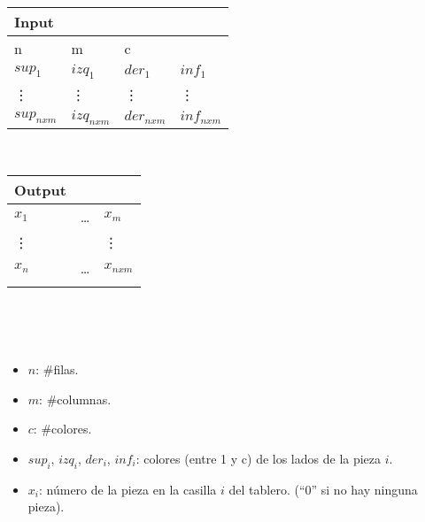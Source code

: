 \documentclass[11pt, a4paper, twoside]{article}
\begin{document}
\begin{center}
\begin{minipage}{0.5\textwidth}
	\begin{tabular}{llll}
		Input  \\
		\hline
		n       & m       & c       &         \\
		$sup_1$ & $izq_1$ & $der_1$ & $inf_1$ \\
		\vdots & \vdots   & \vdots  & \vdots  \\
		$sup_{nxm}$ & $izq_{nxm}$ & $der_{nxm}$ & $inf_{nxm}$ \\ 
	\end{tabular} \\  
\end{minipage}
\begin{minipage}{0.5\textwidth}	
	\begin{tabular}{lll}
		Output  \\
		\hline
		$x_1$ & \dots & $x_m$ \\
		\vdots&       & \vdots \\
		$x_n$ & \dots & $x_{nxm}$ \\
		 \\
	\end{tabular} \\
\end{minipage} \\

\begin{minipage}{0.5\textwidth}
\begin{itemize}
	\item{$n$}: \#filas.
	\item{$m$}: \#columnas.
	\item{$c$}: \#colores.
	\item{$sup_i$, $izq_i$, $der_i$, $inf_i$}: colores (entre 1 y c) de los lados de la pieza $i$.
	\item{$x_i$}: número de la pieza en la casilla $i$ del tablero. (``0'' si no hay ninguna pieza).
\end{itemize}
\end{minipage}
\end{center}
\end{document}
